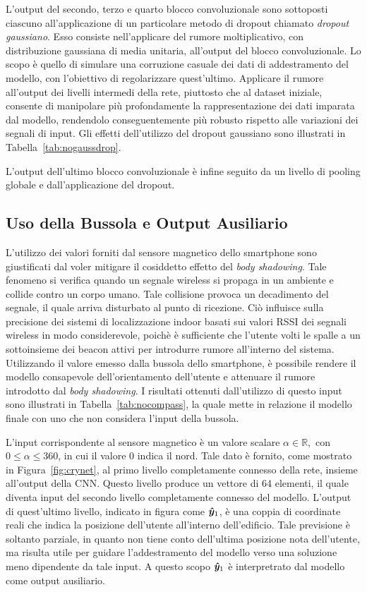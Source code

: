 L'output del secondo, terzo e quarto blocco convoluzionale sono sottoposti
ciascuno all'applicazione di un particolare metodo di dropout chiamato
\emph{dropout gaussiano}. Esso consiste nell'applicare del rumore
moltiplicativo, con distribuzione gaussiana di media unitaria, all'output del
blocco convoluzionale. Lo scopo è quello di simulare una corruzione casuale dei
dati di addestramento del modello, con l'obiettivo di regolarizzare
quest'ultimo. Applicare il rumore all'output dei livelli intermedi della rete,
piuttosto che al dataset iniziale, consente di manipolare più profondamente la
rappresentazione dei dati imparata dal modello, rendendolo conseguentemente più
robusto rispetto alle variazioni dei segnali di
input\cite{noise-hidden-layers}. Gli effetti dell'utilizzo del dropout
gaussiano sono illustrati in Tabella~\ref{tab:nogaussdrop}.


L'output dell'ultimo blocco convoluzionale è infine seguito da un livello di
pooling globale e dall'applicazione del dropout.
\subsection{Uso della Bussola e Output Ausiliario}
L'utilizzo dei valori forniti dal sensore magnetico dello smartphone sono
giustificati dal voler mitigare il cosiddetto effetto del \emph{body
  shadowing}.  Tale fenomeno si verifica quando un segnale wireless si propaga
in un ambiente e collide contro un corpo umano. Tale collisione provoca un
decadimento del segnale, il quale arriva disturbato al punto di ricezione. Ciò
influisce sulla precisione dei sistemi di localizzazione indoor basati sui
valori RSSI dei segnali wireless in modo considerevole, poichè è sufficiente che
l'utente volti le spalle a un sottoinsieme dei beacon attivi per introdurre
rumore all'interno del sistema. Utilizzando il valore emesso dalla bussola
dello smartphone, è possibile rendere il modello consapevole dell'orientamento
dell'utente e attenuare il rumore introdotto dal \emph{body shadowing}. I
risultati ottenuti dall'utilizzo di questo input sono illustrati in
Tabella~\ref{tab:nocompass}, la quale mette in relazione il modello finale con
uno che non considera l'input della bussola.


L'input corrispondente al sensore magnetico è un valore scalare \(\alpha \in
  \mathbb{R}, \) con \(0 \leq \alpha \leq 360\), in cui il valore \(0\) indica
il nord. Tale dato è fornito, come mostrato in Figura~\ref{fig:crynet}, al
primo livello completamente connesso della rete, insieme all'output della
CNN\@.  Questo livello produce un vettore di 64 elementi, il quale diventa
input del secondo livello completamente connesso del modello. L'output di
quest'ultimo livello, indicato in figura come \(\bm\hat{\bm y}_1\), è una coppia
di coordinate reali che indica la posizione dell'utente all'interno
dell'edificio.  Tale previsione è soltanto parziale, in quanto non tiene conto
dell'ultima posizione nota dell'utente, ma risulta utile per guidare
l'addestramento del modello verso una soluzione meno dipendente da tale input.
A questo scopo \(\bm\hat{\bm y}_1\) è interpretrato dal modello come output
ausiliario.

